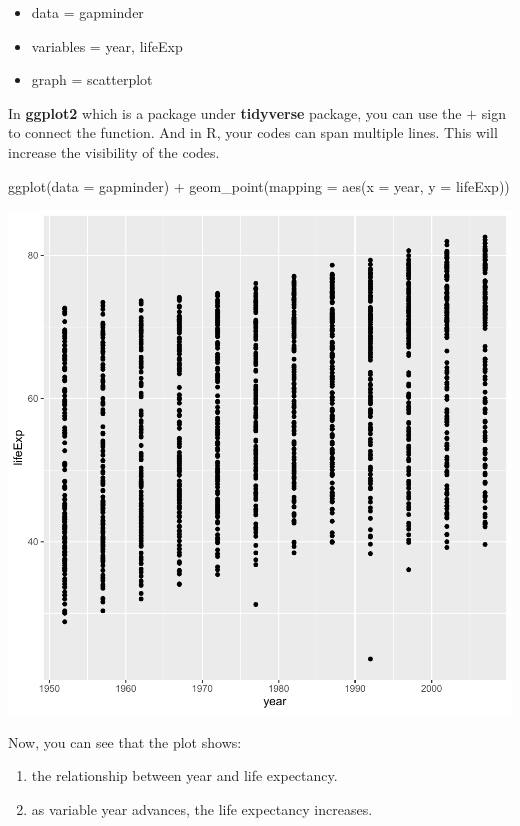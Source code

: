 \documentclass[
]{book}
\makeatletter
\newenvironment{Shaded}{\begin{snugshade}}{\end{snugshade}}
\newcommand{\AttributeTok}[1]{\textcolor[rgb]{0.61,0.61,0.61}{#1}}
\newcommand{\FunctionTok}[1]{\textcolor[rgb]{0,0,0}{#1}}
\newcommand{\NormalTok}[1]{#1}
\newcommand{\SpecialCharTok}[1]{\textcolor[rgb]{0,0,0}{#1}}
\providecommand{\tightlist}{%
  \setlength{\itemsep}{0pt}\setlength{\parskip}{0pt}}
\newenvironment{kframe}{%
\medskip{}
\setlength{\fboxsep}{.8em}
 \def\at@end@of@kframe{}%
 \ifinner\ifhmode%
  \def\at@end@of@kframe{\end{minipage}}%
  \begin{minipage}{\columnwidth}%
 \fi\fi%
 \def\FrameCommand##1{\hskip\@totalleftmargin \hskip-\fboxsep
 \colorbox{shadecolor}{##1}\hskip-\fboxsep
     \hskip-\linewidth \hskip-\@totalleftmargin \hskip\columnwidth}%
 \MakeFramed {\advance\hsize-\width
   \@totalleftmargin\z@ \linewidth\hsize
   \@setminipage}}%
 {\par\unskip\endMakeFramed%
 \at@end@of@kframe}
\renewenvironment{Shaded}{\begin{kframe}}{\end{kframe}}
\makeatother
\begin{document}
\begin{itemize}
\tightlist
\item
  data = gapminder
\item
  variables = year, lifeExp
\item
  graph = scatterplot
\end{itemize}

In \textbf{ggplot2} which is a package under \textbf{tidyverse} package, you can use the \(+\) sign to connect the function. And in R, your codes can span multiple lines. This will increase the visibility of the codes.

\begin{Shaded}
\begin{Highlighting}[]
\FunctionTok{ggplot}\NormalTok{(}\AttributeTok{data =}\NormalTok{ gapminder) }\SpecialCharTok{+}
  \FunctionTok{geom\_point}\NormalTok{(}\AttributeTok{mapping =} \FunctionTok{aes}\NormalTok{(}\AttributeTok{x =}\NormalTok{ year, }\AttributeTok{y =}\NormalTok{ lifeExp))}
\end{Highlighting}
\end{Shaded}

\begin{center}\includegraphics[width=0.7\linewidth,keepaspectratio]{Multivariable_Data_Analysis_files/figure-latex/unnamed-chunk-17-1} \end{center}

Now, you can see that the plot shows:

\begin{enumerate}
\def\labelenumi{\arabic{enumi}.}
\tightlist
\item
  the relationship between year and life expectancy.
\item
  as variable year advances, the life expectancy increases.
\end{enumerate}
\end{document}
